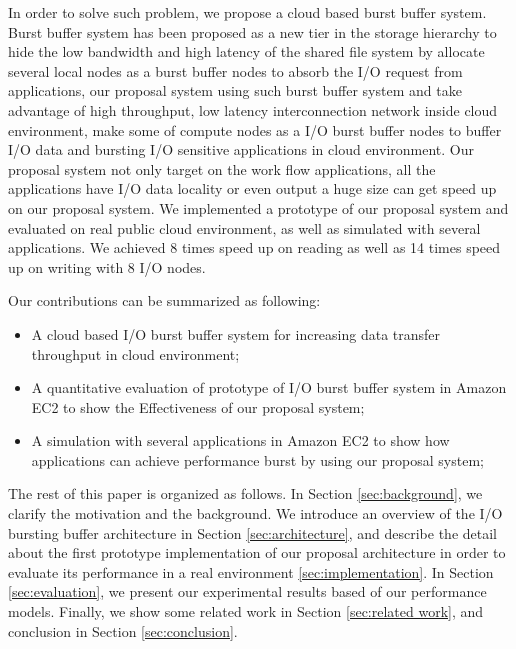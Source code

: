 In order to solve such problem, we propose a cloud based burst buffer system. Burst buffer system
has been proposed as a new tier in the storage hierarchy to hide the low bandwidth and high latency
of the shared file system by allocate several local nodes as a burst buffer nodes to absorb the I/O
request from applications, our proposal system using such burst buffer system and take advantage of
high throughput, low latency interconnection network inside cloud environment, make some of compute nodes as a I/O burst buffer nodes to buffer I/O data and bursting I/O sensitive applications in cloud environment.
Our proposal system not only target on the work flow applications, all the applications have
I/O data locality or even output a huge size can get speed up on our proposal system.
We implemented a prototype of our proposal system and evaluated on real public cloud environment, as
well as simulated with several applications.
We achieved 8 times speed up on reading as well as 14 times speed up on writing with 8 I/O nodes.

Our contributions can be summarized as following:
\begin{itemize}
	\item A cloud based I/O burst buffer system for increasing data transfer throughput in cloud environment;
	\item A quantitative evaluation of prototype of I/O burst buffer system in Amazon EC2 to show the
	Effectiveness of our proposal system;
    \item A simulation with several applications in Amazon EC2 to show how applications can achieve
    performance burst by using our proposal system;
\end{itemize}
The rest of this paper is organized as follows. 
In Section \ref{sec:background}, we clarify the motivation and the background.
We introduce an overview of the I/O bursting buffer architecture in Section \ref{sec:architecture}, 
and describe the detail about the first prototype implementation of our proposal architecture in order to evaluate its performance in a real environment \ref{sec:implementation}. 
In Section \ref{sec:evaluation}, we present our experimental results based of our performance models. %
Finally, we show some related work in Section \ref{sec:related work}, and conclusion in Section \ref{sec:conclusion}.
